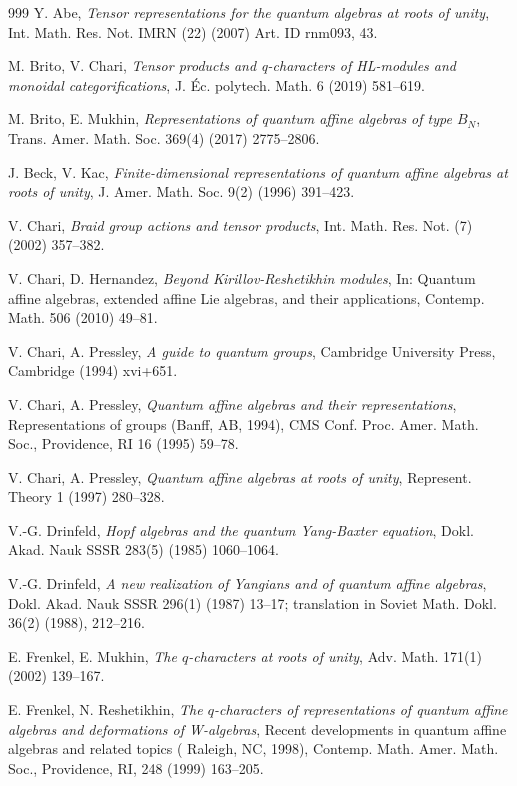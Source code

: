 \documentclass[12pt, reqno]{amsart}
\numberwithin{equation}{section}
\begin{document}
\begin{thebibliography}{999}
 Y. Abe, \textit{Tensor representations for the quantum algebras at roots of unity}, Int. Math. Res. Not. IMRN (22) (2007) Art. ID rnm093, 43.

 M. Brito, V. Chari, \textit{Tensor products and q-characters of HL-modules and monoidal categorifications}, J. \'Ec. polytech. Math. 6 (2019) 581--619.

 M. Brito, E. Mukhin, \textit{Representations of quantum affine algebras of type $B_{N}$}, Trans. Amer. Math. Soc. 369(4) (2017) 2775--2806.

 J. Beck, V. Kac, \textit{Finite-dimensional representations of quantum affine algebras at roots of unity}, J. Amer. Math. Soc. 9(2) (1996) 391--423.

 V. Chari, \textit{Braid group actions and tensor products}, Int. Math. Res. Not. (7) (2002) 357--382.

 V. Chari, D. Hernandez, \textit{Beyond Kirillov-Reshetikhin modules}, In: Quantum affine algebras, extended affine Lie algebras, and their applications, Contemp. Math. 506 (2010) 49--81.

 V. Chari, A. Pressley, \textit{A guide to quantum groups}, Cambridge University Press, Cambridge (1994) xvi+651.

 V. Chari, A. Pressley, \textit{Quantum affine algebras and their representations}, Representations of groups (Banff, {AB}, 1994), CMS Conf. Proc. Amer. Math. Soc., Providence, RI 16 (1995) 59--78.

 V. Chari, A. Pressley, \textit{Quantum affine algebras at roots of unity}, Represent. Theory 1 (1997) 280--328.

 V.-G. Drinfeld, \textit{Hopf algebras and the quantum Yang-Baxter equation}, Dokl. Akad. Nauk SSSR 283(5) (1985) 1060--1064.

 V.-G. Drinfeld, \textit{A new realization of Yangians and of quantum affine algebras}, Dokl. Akad. Nauk SSSR 296(1) (1987) 13--17; translation in Soviet Math. Dokl. 36(2) (1988), 212--216.

 E. Frenkel, E. Mukhin, \textit{The $q$-characters at roots of unity}, Adv. Math. 171(1) (2002) 139--167.

 E. Frenkel, N. Reshetikhin, \textit{The $q$-characters of representations of quantum affine algebras and deformations of W-algebras}, Recent developments in quantum affine algebras and related topics ( Raleigh, {NC}, 1998), Contemp. Math. Amer. Math. Soc., Providence, RI, 248 (1999) 163--205.


\end{thebibliography}
\end{document}
